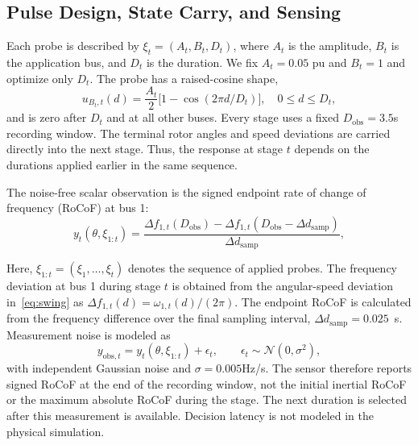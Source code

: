 \documentclass[conference,letterpaper]{IEEEtran}
\begin{document}
\subsection{Pulse Design, State Carry, and Sensing}
Each probe is described by $\xi_t=(A_t,B_t,D_t)$, where $A_t$ is the amplitude, $B_t$ is the application bus, and $D_t$ is the duration. We fix $A_t=0.05$ pu and $B_t=1$ and optimize only $D_t$. The probe has a raised-cosine shape,
\begin{equation}
u_{B_t,t}(d)=\frac{A_t}{2}\bigl[1-\cos(2\pi d/D_t)\bigr],
\quad 0\le d\le D_t,\label{eq:probe}
\end{equation}
and is zero after $D_t$ and at all other buses. Every stage uses a fixed $D_{\mathrm{obs}}=3.5$s recording window. The terminal rotor angles and speed deviations are carried directly into the next stage. Thus, the response at stage $t$ depends on the durations applied earlier in the same sequence.

The noise-free scalar observation is the signed endpoint rate of change of frequency (RoCoF) at bus 1:
\begin{equation}
y_t(\theta,\xi_{1:t})=
\frac{\Delta f_{1,t}(D_{\mathrm{obs}})-\Delta f_{1,t}(D_{\mathrm{obs}}-\Delta d_{\mathrm{samp}})}{\Delta d_{\mathrm{samp}}},
\label{eq:sensor}
\end{equation}

Here, $\xi_{1:t}=(\xi_1,\ldots,\xi_t)$ denotes the sequence of applied probes. The frequency deviation at bus 1 during stage $t$ is obtained from the angular-speed deviation in~\eqref{eq:swing} as $\Delta f_{1,t}(d)=\omega_{1,t}(d)/(2\pi)$. The endpoint RoCoF is calculated from the frequency difference over the final sampling interval, $\Delta d_{\mathrm{samp}}=0.025$~s. Measurement noise is modeled as
\begin{equation}
y_{\mathrm{obs},t}=y_t(\theta,\xi_{1:t})+\epsilon_t,
\qquad \epsilon_t\sim\mathcal N(0,\sigma^2),\label{eq:noise}
\end{equation}
with independent Gaussian noise and $\sigma=0.005$Hz/s. The sensor therefore reports signed RoCoF at the end of the recording window, not the initial inertial RoCoF or the maximum absolute RoCoF during the stage. The next duration is selected after this measurement is available. Decision latency is not modeled in the physical simulation.
\end{document}

